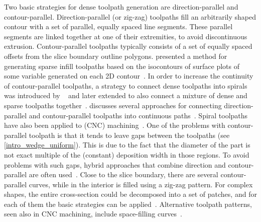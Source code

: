 Two basic strategies for dense toolpath generation are direction-parallel and contour-parallel.
Direction-parallel (or zig-zag) toolpaths fill an arbitrarily shaped contour with a set of parallel, equally spaced line segments.
These parallel segments are linked together at one of their extremities, to avoid discontinuous extrusion.
Contour-parallel toolpaths typically consists of a set of equally spaced offsets from the slice boundary outline polygons.
\citeauthor{steuben2016implicit} presented a method for generating sparse infill toolpaths based on the isocontours of surface plots of some variable generated on each 2D contour~\cite{steuben2016implicit}.
In order to increase the continuity of contour-parallel toolpaths, a strategy to connect dense toolpaths into spirals was introduced by \citeauthor{Zhao2016}~\cite{Zhao2016} and later extended to also connect a mixture of dense and sparse toolpaths together~\cite{KUIPERS2019CAD}.
\citeauthor{Jin2017RCIM} discusses several approaches for connecting direction-parallel and contour-parallel toolpaths into continuous paths~\cite{Jin2017RCIM}.
Spiral toolpaths have also been applied to (CNC) machining~\cite{Held2009,Huang2017}.
One of the problems with contour-parallel toolpath is that it tends to leave gaps between the toolpaths (see \cref{intro_wedge_uniform}).
This is due to the fact that the diameter of the part is not exact multiple of the (constant) deposition width in those regions.
To avoid problems with such gaps, hybrid approaches that combine direction and contour-parallel are often used~\cite{Mcmains2000DETC,Jin2013adaptive}.
Close to the slice boundary, there are several contour-parallel curves, while in the interior is filled using a zig-zag pattern.
For complex shapes, the entire cross-section could be decomposed into a set of patches, and for each of them the basic strategies can be applied~\cite{Ding2014,Jin2017RCIM}.
Alternative toolpath patterns, seen also in CNC machining, include space-filling curves~\cite{Cox1994CAD,Griffiths1994,Shaikh2016}.


